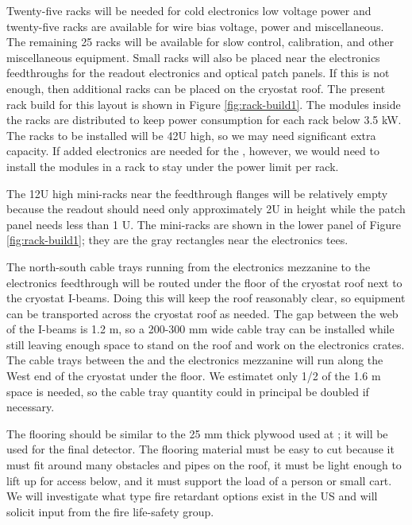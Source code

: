Twenty-five racks will be needed for cold electronics low voltage power and twenty-five racks are available for  wire bias voltage,  power and miscellaneous. 
The remaining 25 racks will be available for slow control, calibration, and other miscellaneous equipment. 
Small racks will also be placed near the electronics feedthroughs for the  readout electronics and optical patch panels. 
If this is not enough, then additional racks can be placed on the cryostat roof. 
The present rack build for this layout is shown in Figure \ref{fig:rack-build1}. The modules inside the racks are distributed to keep power consumption for each rack below 3.5 \si{kW}.
The racks to be installed will be 42U high, so we may need significant extra capacity.  If added electronics are needed for the , however, we would need to install the modules in a  rack to stay under the power limit per rack.

The 12U high mini-racks near the feedthrough flanges will be relatively empty because the  readout should need only approximately 2U in height while the  patch panel needs less than 1 U. The mini-racks are shown in the lower panel of Figure \ref{fig:rack-build1}; they are the gray rectangles near the electronics tees.

The north-south cable trays running from the electronics mezzanine to the electronics feedthrough will be routed under the floor of the cryostat roof next to the cryostat I-beams. 
Doing this will keep the roof reasonably clear, so equipment can be transported across the cryostat roof as needed. 
The gap between the web of the I-beams is 1.2 \si{m}, so a 200-300 \si{mm} wide cable tray can be installed while still leaving enough space to stand on the roof and work on the electronics crates. 
The cable trays between the  and the electronics mezzanine will run along the West end of the cryostat under the floor. 
We estimatet only 1/2 of the 1.6 \si{m} space is needed, so the cable tray quantity could in principal be doubled if necessary. 

The flooring should be similar to the 25 \si{mm} thick plywood used at ; it will be used for the final  detector. 
The flooring material must be easy to cut because it must fit around many obstacles and pipes on the roof, it must be light enough to lift up for access below, and it must support the load of a person or small cart. 
We will investigate what type fire retardant options exist in the US and will solicit input from the  fire life-safety group. 

